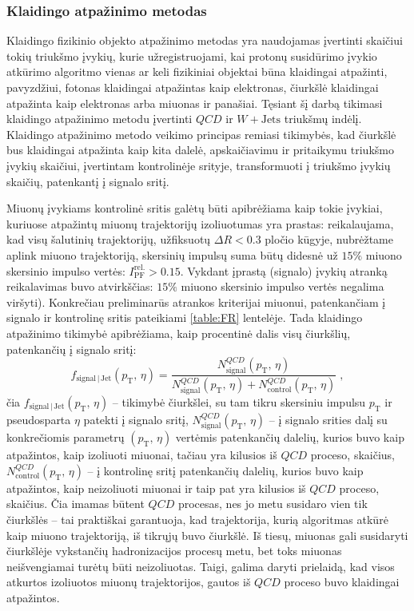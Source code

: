 \documentclass[a4paper, 12pt, oneside]{article}
\newcommand{\pT}{p_{\mathrm{T}}}
\newcommand{\WJets}{W\! +\!\mathrm{Jets}}
\newcommand{\QCD}{QC\! D}
\newlength\q
\begin{document}
\subsubsection{Klaidingo atpažinimo metodas}

Klaidingo fizikinio objekto atpažinimo metodas yra naudojamas įvertinti skaičiui tokių triukšmo įvykių, kurie užregistruojami,
kai protonų susidūrimo įvykio atkūrimo algoritmo vienas ar keli fizikiniai objektai būna klaidingai atpažinti, pavyzdžiui, fotonas
klaidingai atpažintas kaip elektronas, čiurkšlė klaidingai atpažinta kaip elektronas arba miuonas ir panašiai.
Tęsiant šį darbą tikimasi klaidingo atpažinimo metodu įvertinti $\QCD$ ir $\WJets$ triukšmų indėlį.
Klaidingo atpažinimo metodo veikimo principas remiasi tikimybės, kad čiurkšlė bus klaidingai atpažinta kaip kita dalelė,
apskaičiavimu ir pritaikymu triukšmo įvykių skaičiui, įvertintam kontrolinėje srityje, transformuoti į triukšmo įvykių skaičių,
patenkantį į signalo sritį.

Miuonų įvykiams kontrolinė sritis galėtų būti apibrėžiama kaip tokie įvykiai, kuriuose atpažintų miuonų trajektorijų izoliuotumas yra prastas:
reikalaujama, kad visų šalutinių trajektorijų, užfiksuotų $\Delta R < 0.3$ pločio kūgyje, nubrėžtame aplink miuono trajektoriją,
skersinių impulsų suma būtų didesnė už $15\%$ miuono skersinio impulso vertės: $I_{\mathrm{PF}}^{\mathrm{rel.}}>0.15$.
Vykdant įprastą (signalo) įvykių atranką reikalavimas buvo atvirkščias: $15\%$ miuono skersinio impulso vertės negalima viršyti).
Konkrečiau preliminarūs atrankos kriterijai miuonui, patenkančiam į signalo ir kontrolinę sritis pateikiami \ref{table:FR} lentelėje.
Tada klaidingo atpažinimo tikimybė apibrėžiama, kaip procentinė dalis visų čiurkšlių, patenkančių į signalo sritį:
\begin{equation}
	f_{\mathrm{signal} \,| \,\mathrm{Jet}}(\pT, \, \eta) =
	\frac{N^{\QCD}_{\mathrm{signal}}(\pT, \, \eta)}{N^{\QCD}_{\mathrm{signal}}(\pT, \, \eta)+N^{\QCD}_{\mathrm{control}}(\pT, \, \eta)} \; ,
\end{equation}
čia $f_{\mathrm{signal} \,| \,\mathrm{Jet}}(\pT, \, \eta)$ -- tikimybė čiurkšlei, su tam tikru skersiniu impulsu $\pT$ ir pseudosparta $\eta$
patekti į signalo sritį, $N^{\QCD}_{\mathrm{signal}}(\pT, \, \eta)$ -- į signalo srities dalį su konkrečiomis parametrų $(\pT, \, \eta)$
vertėmis patenkančių dalelių, kurios buvo kaip atpažintos, kaip izoliuoti miuonai, tačiau yra kilusios iš $\QCD$ proceso, skaičius,
$N^{\QCD}_{\mathrm{control}}(\pT, \, \eta)$ -- į kontrolinę sritį patenkančių dalelių, kurios buvo kaip atpažintos, kaip neizoliuoti
miuonai ir taip pat yra kilusios iš $\QCD$ proceso, skaičius.
Čia imamas būtent $\QCD$ procesas, nes jo metu susidaro vien tik čiurkšlės -- tai praktiškai garantuoja, kad trajektorija, kurią
algoritmas atkūrė kaip miuono trajektoriją, iš tikrųjų buvo čiurkšlė.
Iš tiesų, miuonas gali susidaryti čiurkšlėje vykstančių hadronizacijos procesų metu, bet toks miuonas neišvengiamai turėtų būti
neizoliuotas.
Taigi, galima daryti prielaidą, kad visos atkurtos izoliuotos miuonų trajektorijos, gautos iš $\QCD$ proceso buvo klaidingai atpažintos.
\end{document}
